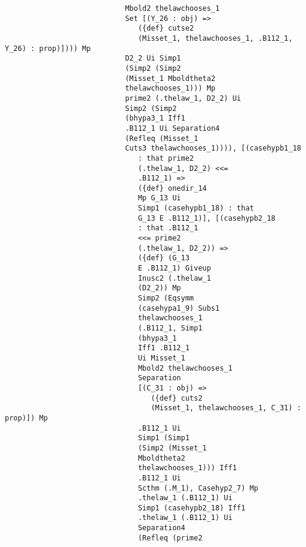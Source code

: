 \documentclass[12pt]{article}
\begin{document}
\begin{verbatim}
                            Mbold2 thelawchooses_1 
                            Set [(Y_26 : obj) => 
                               ({def} cutse2 
                               (Misset_1, thelawchooses_1, .B112_1, Y_26) : prop)]))) Mp 
                            D2_2 Ui Simp1 
                            (Simp2 (Simp2 
                            (Misset_1 Mboldtheta2 
                            thelawchooses_1))) Mp 
                            prime2 (.thelaw_1, D2_2) Ui 
                            Simp2 (Simp2 
                            (bhypa3_1 Iff1 
                            .B112_1 Ui Separation4 
                            (Refleq (Misset_1 
                            Cuts3 thelawchooses_1)))), [(casehypb1_18 
                               : that prime2 
                               (.thelaw_1, D2_2) <<= 
                               .B112_1) => 
                               ({def} onedir_14 
                               Mp G_13 Ui 
                               Simp1 (casehypb1_18) : that 
                               G_13 E .B112_1)], [(casehypb2_18 
                               : that .B112_1 
                               <<= prime2 
                               (.thelaw_1, D2_2)) => 
                               ({def} (G_13 
                               E .B112_1) Giveup 
                               Inusc2 (.thelaw_1 
                               (D2_2)) Mp 
                               Simp2 (Eqsymm 
                               (casehypa1_9) Subs1 
                               thelawchooses_1 
                               (.B112_1, Simp1 
                               (bhypa3_1 
                               Iff1 .B112_1 
                               Ui Misset_1 
                               Mbold2 thelawchooses_1 
                               Separation 
                               [(C_31 : obj) => 
                                  ({def} cuts2 
                                  (Misset_1, thelawchooses_1, C_31) : prop)]) Mp 
                               .B112_1 Ui 
                               Simp1 (Simp1 
                               (Simp2 (Misset_1 
                               Mboldtheta2 
                               thelawchooses_1))) Iff1 
                               .B112_1 Ui 
                               Scthm (.M_1), Casehyp2_7) Mp 
                               .thelaw_1 (.B112_1) Ui 
                               Simp1 (casehypb2_18) Iff1 
                               .thelaw_1 (.B112_1) Ui 
                               Separation4 
                               (Refleq (prime2 

\end{verbatim}
\end{document}
